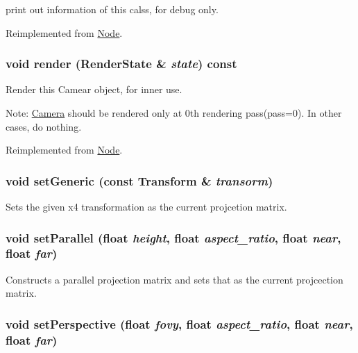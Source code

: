 print out information of this calss, for debug only. 

Reimplemented from \hyperlink{classm3g_1_1Node_6fea17fa1532df3794f8cb39cb4f911f}{Node}.\hypertarget{classm3g_1_1Camera_8babc8a79b78615da51161e94029eea9}{
\subsubsection[{render}]{\setlength{\rightskip}{0pt plus 5cm}void render ({\bf RenderState} \& {\em state}) const}}
\label{classm3g_1_1Camera_8babc8a79b78615da51161e94029eea9}


Render this Camear object, for inner use.

Note: \hyperlink{classm3g_1_1Camera}{Camera} should be rendered only at 0th rendering pass(pass=0). In other cases, do nothing. 

Reimplemented from \hyperlink{classm3g_1_1Node_8babc8a79b78615da51161e94029eea9}{Node}.\hypertarget{classm3g_1_1Camera_51c42821097e90d3f59e87676684f60a}{
\subsubsection[{setGeneric}]{\setlength{\rightskip}{0pt plus 5cm}void setGeneric (const {\bf Transform} \& {\em transorm})}}
\label{classm3g_1_1Camera_51c42821097e90d3f59e87676684f60a}


Sets the given x4 transformation as the current projcetion matrix. \hypertarget{classm3g_1_1Camera_cb4535fd75b28b4d58390962d0c0e588}{
\subsubsection[{setParallel}]{\setlength{\rightskip}{0pt plus 5cm}void setParallel (float {\em height}, \/  float {\em aspect\_\-ratio}, \/  float {\em near}, \/  float {\em far})}}
\label{classm3g_1_1Camera_cb4535fd75b28b4d58390962d0c0e588}


Constructs a parallel projection matrix and sets that as the current projcection matrix. \hypertarget{classm3g_1_1Camera_ca92a48ebe3424deac8e54c27550189d}{
\subsubsection[{setPerspective}]{\setlength{\rightskip}{0pt plus 5cm}void setPerspective (float {\em fovy}, \/  float {\em aspect\_\-ratio}, \/  float {\em near}, \/  float {\em far})}}
\label{classm3g_1_1Camera_ca92a48ebe3424deac8e54c27550189d}


